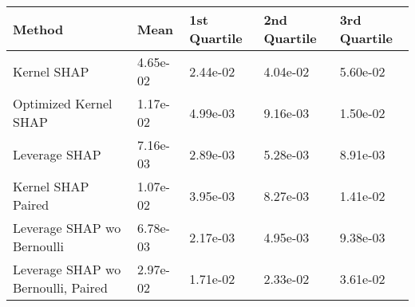 \begin{tabular}{lllll}
  \toprule
  \textbf{Method} & \textbf{Mean} & \textbf{1st Quartile} & \textbf{2nd Quartile} & \textbf{3rd Quartile} \\ \midrule 
Kernel SHAP & 4.65e-02 & 2.44e-02 & 4.04e-02 & 5.60e-02\\
Optimized Kernel SHAP & 1.17e-02 & 4.99e-03 & 9.16e-03 & 1.50e-02\\
Leverage SHAP & \cellcolor{silver!60}7.16e-03 & \cellcolor{silver!60}2.89e-03 & \cellcolor{silver!60}5.28e-03 & \cellcolor{gold!60}8.91e-03\\
Kernel SHAP Paired & \cellcolor{bronze!60}1.07e-02 & \cellcolor{bronze!60}3.95e-03 & \cellcolor{bronze!60}8.27e-03 & \cellcolor{bronze!60}1.41e-02\\
Leverage SHAP wo Bernoulli & \cellcolor{gold!60}6.78e-03 & \cellcolor{gold!60}2.17e-03 & \cellcolor{gold!60}4.95e-03 & \cellcolor{silver!60}9.38e-03\\
Leverage SHAP wo Bernoulli, Paired & 2.97e-02 & 1.71e-02 & 2.33e-02 & 3.61e-02\\
\bottomrule
\end{tabular}